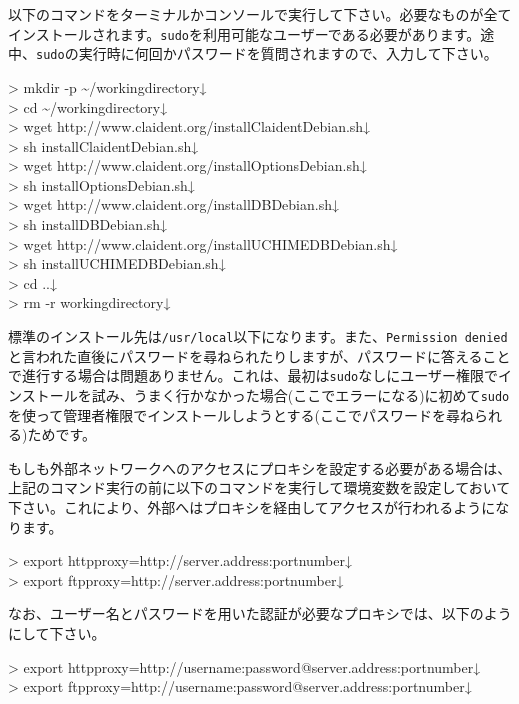 \documentclass[titlepage,10pt,a4paper]{jsbook}
\newenvironment{cmd}{\begin{oframed}\raggedright\ttfamily\footnotesize\setlength{\baselineskip}{1.4em}}{\end{oframed}\vspace{-1em}}
\begin{document}
以下のコマンドをターミナルかコンソールで実行して下さい。必要なものが全てインストールされます。\texttt{sudo}を利用可能なユーザーである必要があります。途中、\texttt{sudo}の実行時に何回かパスワードを質問されますので、入力して下さい。
\begin{cmd}
{\textgreater} mkdir -p {\textasciitilde}/workingdirectory↓\\
{\textgreater} cd {\textasciitilde}/workingdirectory↓\\
{\textgreater} wget http://www.claident.org/installClaident{\textunderscore}Debian.sh↓\\
{\textgreater} sh installClaident{\textunderscore}Debian.sh↓\\
{\textgreater} wget http://www.claident.org/installOptions{\textunderscore}Debian.sh↓\\
{\textgreater} sh installOptions{\textunderscore}Debian.sh↓\\
{\textgreater} wget http://www.claident.org/installDB{\textunderscore}Debian.sh↓\\
{\textgreater} sh installDB{\textunderscore}Debian.sh↓\\
{\textgreater} wget http://www.claident.org/installUCHIMEDB{\textunderscore}Debian.sh↓\\
{\textgreater} sh installUCHIMEDB{\textunderscore}Debian.sh↓\\
{\textgreater} cd ..↓\\
{\textgreater} rm -r workingdirectory↓
\end{cmd}
標準のインストール先は\texttt{/usr/local}以下になります。また、\texttt{Permission denied}と言われた直後にパスワードを尋ねられたりしますが、パスワードに答えることで進行する場合は問題ありません。これは、最初は\texttt{sudo}なしにユーザー権限でインストールを試み、うまく行かなかった場合(ここでエラーになる)に初めて\texttt{sudo}を使って管理者権限でインストールしようとする(ここでパスワードを尋ねられる)ためです。

もしも外部ネットワークへのアクセスにプロキシを設定する必要がある場合は、上記のコマンド実行の前に以下のコマンドを実行して環境変数を設定しておいて下さい。これにより、外部へはプロキシを経由してアクセスが行われるようになります。
\begin{cmd}
{\textgreater} export http{\textunderscore}proxy=http://server.address:portnumber↓\\
{\textgreater} export ftp{\textunderscore}proxy=http://server.address:portnumber↓
\end{cmd}
なお、ユーザー名とパスワードを用いた認証が必要なプロキシでは、以下のようにして下さい。
\begin{cmd}
{\textgreater} export http{\textunderscore}proxy=http://username:password@server.address:portnumber↓\\
{\textgreater} export ftp{\textunderscore}proxy=http://username:password@server.address:portnumber↓
\end{cmd}
\end{document}
